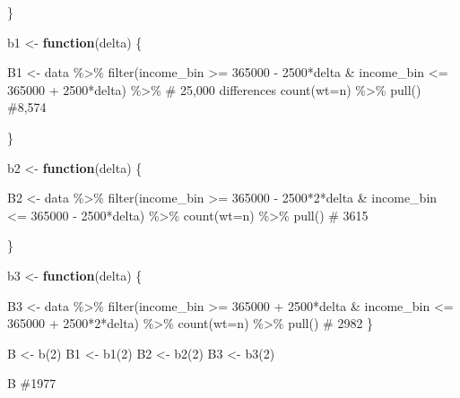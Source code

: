 \documentclass[
  letterpaper,
  DIV=11,
  numbers=noendperiod]{scrartcl}
\newenvironment{Shaded}{\begin{snugshade}}{\end{snugshade}}
\newcommand{\AttributeTok}[1]{\textcolor[rgb]{0.40,0.45,0.13}{#1}}
\newcommand{\CommentTok}[1]{\textcolor[rgb]{0.37,0.37,0.37}{#1}}
\newcommand{\ControlFlowTok}[1]{\textcolor[rgb]{0.00,0.23,0.31}{\textbf{#1}}}
\newcommand{\DecValTok}[1]{\textcolor[rgb]{0.68,0.00,0.00}{#1}}
\newcommand{\FunctionTok}[1]{\textcolor[rgb]{0.28,0.35,0.67}{#1}}
\newcommand{\NormalTok}[1]{\textcolor[rgb]{0.00,0.23,0.31}{#1}}
\newcommand{\OtherTok}[1]{\textcolor[rgb]{0.00,0.23,0.31}{#1}}
\newcommand{\SpecialCharTok}[1]{\textcolor[rgb]{0.37,0.37,0.37}{#1}}
\begin{document}
\begin{Shaded}
\begin{Highlighting}[]
\NormalTok{\}}

\NormalTok{b1 }\OtherTok{\textless{}{-}} \ControlFlowTok{function}\NormalTok{(delta) \{}

\NormalTok{B1  }\OtherTok{\textless{}{-}}\NormalTok{ data }\SpecialCharTok{\%\textgreater{}\%} 
  \FunctionTok{filter}\NormalTok{(income\_bin }\SpecialCharTok{\textgreater{}=} \DecValTok{365000} \SpecialCharTok{{-}} \DecValTok{2500}\SpecialCharTok{*}\NormalTok{delta }\SpecialCharTok{\&}\NormalTok{ income\_bin }\SpecialCharTok{\textless{}=} \DecValTok{365000} \SpecialCharTok{+} \DecValTok{2500}\SpecialCharTok{*}\NormalTok{delta) }\SpecialCharTok{\%\textgreater{}\%}  \CommentTok{\# 25,000 differences}
  \FunctionTok{count}\NormalTok{(}\AttributeTok{wt=}\NormalTok{n) }\SpecialCharTok{\%\textgreater{}\%} 
  \FunctionTok{pull}\NormalTok{() }\CommentTok{\#8,574}

\NormalTok{\}}

\NormalTok{b2 }\OtherTok{\textless{}{-}} \ControlFlowTok{function}\NormalTok{(delta) \{}

\NormalTok{B2 }\OtherTok{\textless{}{-}}\NormalTok{ data }\SpecialCharTok{\%\textgreater{}\%} 
  \FunctionTok{filter}\NormalTok{(income\_bin }\SpecialCharTok{\textgreater{}=} \DecValTok{365000} \SpecialCharTok{{-}} \DecValTok{2500}\SpecialCharTok{*}\DecValTok{2}\SpecialCharTok{*}\NormalTok{delta }\SpecialCharTok{\&}\NormalTok{ income\_bin }\SpecialCharTok{\textless{}=} \DecValTok{365000} \SpecialCharTok{{-}} \DecValTok{2500}\SpecialCharTok{*}\NormalTok{delta) }\SpecialCharTok{\%\textgreater{}\%} 
  \FunctionTok{count}\NormalTok{(}\AttributeTok{wt=}\NormalTok{n) }\SpecialCharTok{\%\textgreater{}\%} 
  \FunctionTok{pull}\NormalTok{() }\CommentTok{\# 3615}

\NormalTok{\}}

\NormalTok{b3 }\OtherTok{\textless{}{-}} \ControlFlowTok{function}\NormalTok{(delta) \{}

\NormalTok{B3 }\OtherTok{\textless{}{-}}\NormalTok{ data }\SpecialCharTok{\%\textgreater{}\%} 
  \FunctionTok{filter}\NormalTok{(income\_bin }\SpecialCharTok{\textgreater{}=} \DecValTok{365000} \SpecialCharTok{+} \DecValTok{2500}\SpecialCharTok{*}\NormalTok{delta }\SpecialCharTok{\&}\NormalTok{ income\_bin }\SpecialCharTok{\textless{}=} \DecValTok{365000} \SpecialCharTok{+} \DecValTok{2500}\SpecialCharTok{*}\DecValTok{2}\SpecialCharTok{*}\NormalTok{delta) }\SpecialCharTok{\%\textgreater{}\%} 
  \FunctionTok{count}\NormalTok{(}\AttributeTok{wt=}\NormalTok{n) }\SpecialCharTok{\%\textgreater{}\%} 
  \FunctionTok{pull}\NormalTok{() }\CommentTok{\# 2982}
\NormalTok{\}}

\NormalTok{B }\OtherTok{\textless{}{-}} \FunctionTok{b}\NormalTok{(}\DecValTok{2}\NormalTok{)}
\NormalTok{B1 }\OtherTok{\textless{}{-}} \FunctionTok{b1}\NormalTok{(}\DecValTok{2}\NormalTok{)}
\NormalTok{B2 }\OtherTok{\textless{}{-}} \FunctionTok{b2}\NormalTok{(}\DecValTok{2}\NormalTok{)}
\NormalTok{B3 }\OtherTok{\textless{}{-}} \FunctionTok{b3}\NormalTok{(}\DecValTok{2}\NormalTok{)}

\NormalTok{B }\CommentTok{\#1977}
\end{Highlighting}
\end{Shaded}
\end{document}

